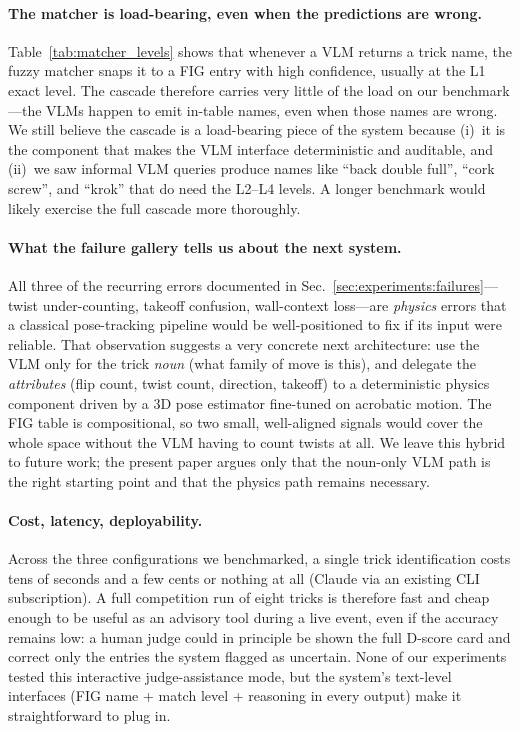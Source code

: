 \paragraph{The matcher is load-bearing, even when the predictions are
wrong.}
Table~\ref{tab:matcher_levels} shows that whenever a VLM returns a
trick name, the fuzzy matcher snaps it to a FIG entry with high
confidence, usually at the L1 exact level. The cascade therefore
carries very little of the load on our benchmark---the VLMs happen
to emit in-table names, even when those names are wrong. We still
believe the cascade is a load-bearing piece of the system because
(i)~it is the component that makes the VLM interface deterministic
and auditable, and (ii)~we saw informal VLM queries produce names
like ``back double full'', ``cork screw'', and ``krok'' that do need
the L2--L4 levels. A longer benchmark would likely exercise the
full cascade more thoroughly.

\paragraph{What the failure gallery tells us about the next system.}
All three of the recurring errors documented in
Sec.~\ref{sec:experiments:failures}---twist under-counting, takeoff
confusion, wall-context loss---are \emph{physics} errors that a
classical pose-tracking pipeline would be well-positioned to fix if
its input were reliable. That observation suggests a very concrete
next architecture: use the VLM only for the trick \emph{noun} (what
family of move is this), and delegate the \emph{attributes} (flip
count, twist count, direction, takeoff) to a deterministic physics
component driven by a 3D pose estimator fine-tuned on acrobatic
motion. The FIG table is compositional, so two small, well-aligned
signals would cover the whole space without the VLM having to count
twists at all. We leave this hybrid to future work; the present
paper argues only that the noun-only VLM path is the right starting
point and that the physics path remains necessary.

\paragraph{Cost, latency, deployability.}
Across the three configurations we benchmarked, a single trick
identification costs tens of seconds and a few cents or nothing
at all (Claude via an existing CLI subscription). A full competition
run of eight tricks is therefore fast and cheap enough to be useful
as an advisory tool during a live event, even if the accuracy
remains low: a human judge could in principle be shown the full
D-score card and correct only the entries the system flagged as
uncertain. None of our experiments tested this interactive
judge-assistance mode, but the system's text-level interfaces
(FIG name + match level + reasoning in every output) make it
straightforward to plug in.

